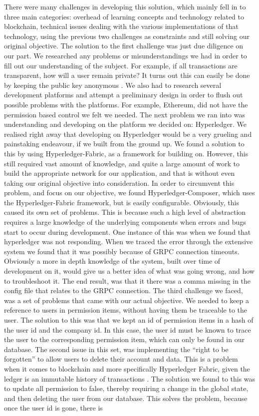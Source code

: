 \documentclass[11pt,journal]{IEEEtran}
\begin{document}
There were many challenges in developing this solution, which mainly fell in to three main categories:  overhead of learning concepts and technology related to blockchain, technical issues dealing with the various implementations of that technology, using the previous two challenges as constraints and still solving our original objective.  The solution to the first challenge was just due diligence on our part.  We researched any problems or misunderstandings we had in order to fill out our understanding of the subject.  For example, if all transactions are transparent, how will a user remain private?  It turns out this can easily be done by keeping the public key anonymous \cite{nakamoto2008bitcoin}.  We also had to research several development platforms and attempt a preliminary design in order to flush out possible problems with the platforms.  For example, Ethereum, did not have the permission based control we felt we needed.  The next problem we ran into was understanding and developing on the platform we decided on: Hyperledger.  We realised right away that developing on Hyperledger would be a very grueling and painstaking endeavour, if we built from the ground up.  We found a solution to this by using Hyperledger-Fabric, as a framework for building on.  However, this still required vast amount of knowledge, and quite a large amount of work to build the appropriate network for our application, and that is without even taking our original objective into consideration.  In order to circumvent this problem, and focus on our objective, we found Hyperledger-Composer, which uses the Hyperledger-Fabric framework, but is easily configurable.  Obviously, this caused its own set of problems.  This is because such a high level of abstraction requires a large knowledge of the underlying components when errors and bugs start to occur during development.  One instance of this was when we found that hyperledger was not responding.  When we traced the error through the extensive system we found that it was possibly because of GRPC connection timeouts.  Obviously a more in depth knowledge of the system, built over time of development on it, would give us a better idea of what was going wrong, and how to troubleshoot it.  The end result, was that it there was a comma missing in the config file that relates to the GRPC connection.  The third challenge we faced, was a set of problems that came with our actual objective.  We needed to keep a reference to users in permission items, without having them be traceable to the user.  The solution to this was that we kept an id of permission items in a hash of the user id and the company id.  In this case, the user id must be known to trace the user to the corresponding permission item, which can only be found in our database.  The second issue in this set, was implementing the “right to be forgotten” to allow users to delete their account and data. This is a problem when it comes to blockchain and more specifically Hyperledger Fabric, given the ledger is an immutable history of transactions \cite{WhyHyper54:online}.   The solution we found to this was to update all permission to false, thereby requiring a change in the global state, and then deleting the user from our database.  This solves the problem, because once the user id is gone, there is 
\end{document}
